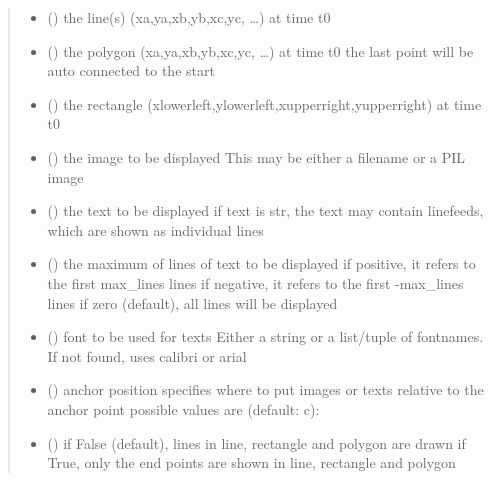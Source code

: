 \documentclass[letterpaper,10pt,english]{sphinxmanual}
\begin{document}
\begin{fulllineitems}
\begin{quote}
\begin{description}
\begin{itemize}
\item {} 
 () \textendash{} the line(s) (xa,ya,xb,yb,xc,yc, …) at time t0

\item {} 
 () \textendash{} the polygon (xa,ya,xb,yb,xc,yc, …) at time t0 
the last point will be auto connected to the start

\item {} 
 () \textendash{} the rectangle (xlowerleft,ylowerleft,xupperright,yupperright) at time t0 

\item {} 
 () \textendash{} the image to be displayed 
This may be either a filename or a PIL image

\item {} 
 (\sphinxstyleliteralemphasis{, }) \textendash{} the text to be displayed 
if text is str, the text may contain linefeeds, which are shown as individual lines

\item {} 
 () \textendash{} the maximum of lines of text to be displayed 
if positive, it refers to the first max\_lines lines 
if negative, it refers to the first -max\_lines lines 
if zero (default), all lines will be displayed

\item {} 
 () \textendash{} font to be used for texts 
Either a string or a list/tuple of fontnames.
If not found, uses calibri or arial

\item {} 
 () \textendash{} anchor position 
specifies where to put images or texts relative to the anchor
point 
possible values are (default: c): 

\item {} 
 () \textendash{} if False (default), lines in line, rectangle and polygon are drawn 
if True, only the end points are shown in line, rectangle and polygon


\end{itemize}
\end{description}
\end{quote}
\end{fulllineitems}
\end{document}
